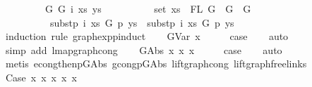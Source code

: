 \begin{isabellebody}
\ \ \ \ \ \ \ \ \ {\isacharparenleft}{\kern0pt}{\isasymforall}G{}\ G{}\ i\ xs\ ys{\isachardot}{\kern0pt}\isanewline
\ \ \ \ \ \ \ \ \ \ set\ xs\ {\isacharequal}{\kern0pt}\ FL\ G{}\ {\isacharminus}{\kern0pt}{\isacharminus}{\kern0pt}{\isachargreater}{\kern0pt}\ G{}\ {\isasymsimeq}\ G{}\ {\isacharminus}{\kern0pt}{\isacharminus}{\kern0pt}{\isachargreater}{\kern0pt}\isanewline
\ \ \ \ \ \ \ \ \ \ subst{\isacharunderscore}{\kern0pt}p\ i\ xs\ G{}\ p\ ys\ {\isasymsimeq}\ subst{\isacharunderscore}{\kern0pt}p\ i\ xs\ G{}\ p\ ys{\isacharparenright}{\kern0pt}{\isachardoublequoteclose}\isanewline
%
\isadelimproof
%
\endisadelimproof
%
\isatagproof
{}\isamarkupfalse%
\ {\isacharparenleft}{\kern0pt}induction\ rule{\isacharcolon}{\kern0pt}\ graph{\isacharunderscore}{\kern0pt}exp{\isacharunderscore}{\kern0pt}p{\isachardot}{\kern0pt}induct{\isacharparenright}{\kern0pt}\isanewline
\ \ \isamarkupfalse%
\ {\isacharparenleft}{\kern0pt}GVar\ x{\isacharparenright}{\kern0pt}\isanewline
\ \ \isamarkupfalse%
\ \isamarkupfalse%
\ {\isacharquery}{\kern0pt}case\isanewline
\ \ \isamarkupfalse%
\ auto\isanewline
\ \ \isamarkupfalse%
\ {\isacharparenleft}{\kern0pt}simp\ add{\isacharcolon}{\kern0pt}\ lmap{\isacharunderscore}{\kern0pt}graph{\isacharunderscore}{\kern0pt}cong{\isacharparenright}{\kern0pt}\isanewline
{}\isamarkupfalse%
\isanewline
\ \ \isamarkupfalse%
\ {\isacharparenleft}{\kern0pt}GAbs\ x{}\ x{}\ x{}{\isacharparenright}{\kern0pt}\isanewline
\ \ \isamarkupfalse%
\ \isamarkupfalse%
\ {\isacharquery}{\kern0pt}case\isanewline
\ \ \isamarkupfalse%
\ auto\isanewline
\ \ \isamarkupfalse%
\ {\isacharparenleft}{\kern0pt}metis\ econg{\isacharunderscore}{\kern0pt}then{\isacharunderscore}{\kern0pt}p{\isacharunderscore}{\kern0pt}GAbs\ gcong{\isachardot}{\kern0pt}p{\isacharunderscore}{\kern0pt}GAbs\ lift{\isacharunderscore}{\kern0pt}graph{\isacharunderscore}{\kern0pt}cong\ lift{\isacharunderscore}{\kern0pt}graph{\isacharunderscore}{\kern0pt}freelinks{\isacharparenright}{\kern0pt}\isanewline
{}\isamarkupfalse%
\isanewline
\ \ \isamarkupfalse%
\ {\isacharparenleft}{\kern0pt}Case\ x{}\ x{}\ x{}\ x{}\ x{}{\isacharparenright}{\kern0pt}\isanewline

\end{isabellebody}

